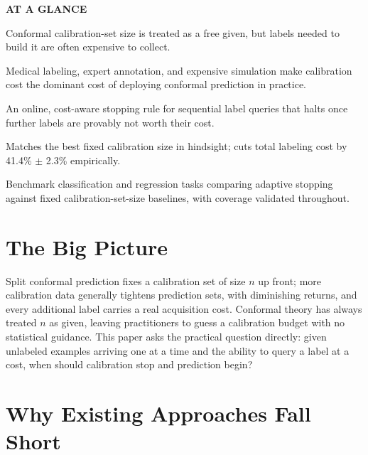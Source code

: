 \documentclass[10pt,twocolumn]{article}
\begin{document}
\begin{mdframed}[backgroundcolor=boxgray,linecolor=rulered,linewidth=1pt,
    innerleftmargin=6pt,innerrightmargin=6pt,
    innertopmargin=6pt,innerbottommargin=6pt]
\textbf{\small AT A GLANCE}\par\vspace{4pt}
\begin{description}[leftmargin=0pt,labelsep=4pt,itemsep=2pt,parsep=0pt,
    font=\small\bfseries]
  \item[Problem:] Conformal calibration-set size is treated as a free
    given, but labels needed to build it are often expensive to
    collect.
  \item[Why it matters:] Medical labeling, expert annotation, and
    expensive simulation make calibration cost the dominant cost of
    deploying conformal prediction in practice.
  \item[Method:] An online, cost-aware stopping rule for sequential
    label queries that halts once further labels are provably not
    worth their cost.
  \item[Result:] Matches the best fixed calibration size in hindsight;
    cuts total labeling cost by 41.4\% $\pm$ 2.3\% empirically.
  \item[Evidence:] Benchmark classification and regression tasks
    comparing adaptive stopping against fixed calibration-set-size
    baselines, with coverage validated throughout.
\end{description}
\end{mdframed}

\section{The Big Picture}

Split conformal prediction fixes a calibration set of size $n$ up
front; more calibration data generally tightens prediction sets, with
diminishing returns, and every additional label carries a real
acquisition cost. Conformal theory has always treated $n$ as given,
leaving practitioners to guess a calibration budget with no
statistical guidance. This paper asks the practical question directly:
given unlabeled examples arriving one at a time and the ability to
query a label at a cost, when should calibration stop and prediction
begin?

\section{Why Existing Approaches Fall Short}
\end{document}

